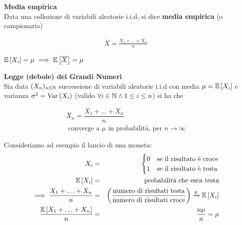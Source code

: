 \begin{defn}
    \textbf{Media empirica} \\
    Data una collezione di variabili aleatorie i.i.d, si dice \textbf{media
    empirica} (o campionaria)

    \begin{equation*}
        \begin{aligned}
            \overline{X} = \frac{X_1 + \hdots + X_n}{n}
        \end{aligned}
    \end{equation*}


    \begin{note}
    $\mathbb{E}\left[X_i\right] = \mu \implies \mathbb{E}\left[\overline{X}\right] = \mu$
    \end{note}

\end{defn}


\begin{defn}
    \textbf{Legge (debole) dei Grandi Numeri} \\
    Sia data $(X_n)_{n \in \mathbb{N}}$ successione di variabili aleatorie i.i.d con
    media $\mu = \mathbb{E}\left[X_i\right]$ e varianza $\sigma^2 = \text{Var}\left(X_i\right)$ (valido $\forall i \in \mathbb{N}
    \land 1 \leq i \leq n$) si ha che

    \begin{equation*}
        \begin{aligned}
            \overline{X}_n = \dfrac{X_1 + \hdots + X_n}{n} \\
            \text{ converge a } \mu \text{ in probabilità, per } n \to \infty
        \end{aligned}
    \end{equation*}
\end{defn}

\begin{exmp}
    Consideriamo ad esempio il lancio di una moneta:
    \begin{eqnarray*}
            X_i &=& \begin{cases}
                0 & \text{se il risultato è croce} \\
                1 & \text{se il risultato è testa}
            \end{cases} \\
            \mathbb{E}\left[X_i\right] &=& \text{probabilità che esca testa} \\
            \implies \frac{X_1 + \hdots + X_n}{n} &=& \left(\frac{\text{numero di risultati testa}}{\text{numero di risultati croce}}\right)
            \xrightarrow{p} \mathbb{E}\left[X_i\right] \\
            \frac{\mathbb{E}\left[X_1 + \hdots + X_n\right]}{n} &=& \frac{n\mu}{n} = \mu
    \end{eqnarray*}
\end{exmp}


